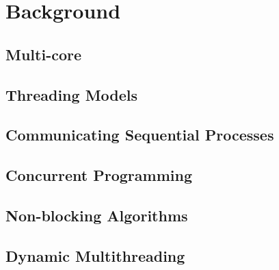 

\chapter{Background}
\label{ch:background}

\section{Multi-core}
\section{Threading Models} 
\section{Communicating Sequential Processes}
\section{Concurrent Programming}
\section{Non-blocking Algorithms}
\section{Dynamic Multithreading}
